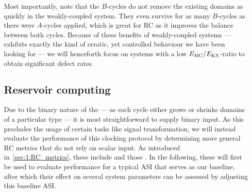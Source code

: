 \vspace{-1em}
\vspace{-1em}

Most importantly, note that the $B$-cycles do not remove the existing domains as quickly in the weakly-coupled system.
They even survive for as many $B$-cycles as there were $A$-cycles applied, which is great for RC as it improves the balance between both cycles.
Because of these benefits of weakly-coupled systems ---  exhibits exactly the kind of erratic, yet controlled behaviour we have been looking for --- we will henceforth focus on systems with a low $E_\mathrm{MC}/E_\mathrm{EA}$-ratio to obtain significant defect rates.

\subsection{Reservoir computing}
Due to the binary nature of the  --- as each cycle either grows or shrinks domains of a particular type --- it is most straightforward to supply binary input. %
As this precludes the usage of certain tasks like signal transformation, we will instead evaluate the performance of this clocking protocol by determining more general RC metrics that do not rely on scalar input.
As introduced in~\cref{sec:1:RC_metrics}, these include  and those .
In the following, these will first be used to evaluate performance for a typical ASI that serves as our baseline, after which their effect on several system parameters can be assessed by adjusting this baseline ASI.

